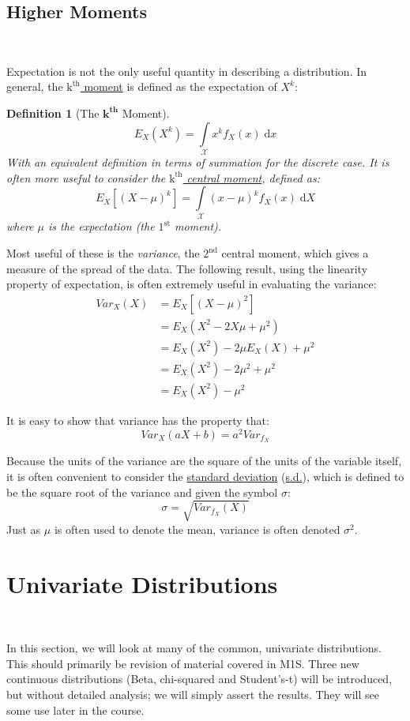 \documentclass[12pt,a4paper]{article}
\newtheorem{defn}[thm]{Definition}
\begin{document}
\subsection{Higher Moments}$\;$

Expectation is not the only useful quantity in describing a distribution. In general, the \underline{$\mathrm{k^{th}}$ moment} is defined as the expectation of $X^k$:

\begin{defn}[The $\mathbf{k^{th}}$ Moment]
$$E_{X}(X^k) = \int\limits_{\mathcal{X}}\! x^k f_X(x) \;\mathrm{d}x$$
With an equivalent definition in terms of summation for the discrete case.
It is often more useful to consider the \underline{$\mathrm{k^{th}}$ central moment}, defined as:
$$E_{X}[(X - \mu)^k] = \int\limits_{\mathcal{X}}\! (x - \mu)^k f_X(x)\;\mathrm{d}X$$
where $\mu$ is the expectation (the $\mathrm{1^{st}}$ moment).
\end{defn}

Most useful of these is the \emph{variance}, the $\mathrm{2^{nd}}$ central moment, which gives a measure of the spread of the data. The following result, using the linearity property of expectation, is often extremely useful in evaluating the variance:
\begin{align*}
Var_{X}(X) &= E_{X}[(X - \mu)^2]\\
&= E_{X}(X^2 - 2X\mu + \mu^2)\\
&= E_{X}(X^2) - 2\mu E_{X}(X) + \mu^2\\
&= E_{X}(X^2) - 2\mu^2 + \mu^2\\
&= E_{X}(X^2) - \mu^2
\end{align*}

It is easy to show that variance has the property that:
$$Var_{X}(aX + b) = a^2 Var_{f_X}$$

Because the units of the variance are the square of the units of the variable itself, it is often convenient to consider the \underline{standard deviation} (\underline{s.d.}), which is defined to be the square root of the variance and given the symbol $\sigma$:
$$\sigma = \sqrt{Var_{f_X}(X)}$$
Just as $\mu$ is often used to denote the mean, variance is often denoted $\sigma^2$.

\clearpage
\section{Univariate Distributions}$\;$

In this section, we will look at many of the common, univariate distributions. This should primarily be revision of material covered in M1S. Three new continuous distributions (Beta, chi-squared and Student's-t) will be introduced, but without detailed analysis; we will simply assert the results. They will see some use later in the course.
\end{document}
